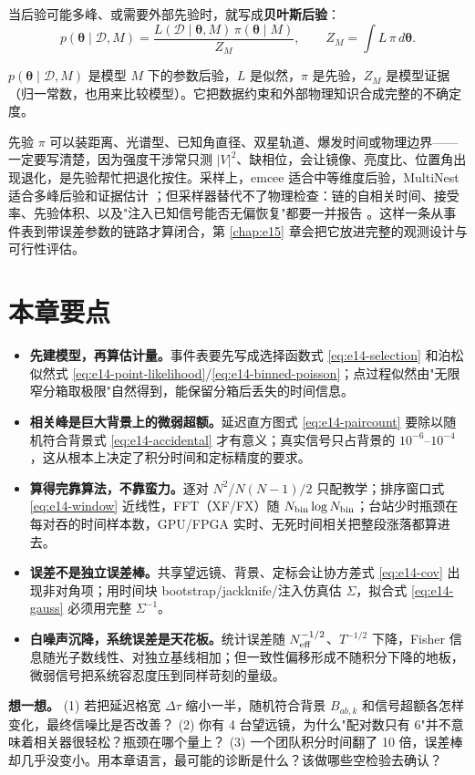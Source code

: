 当后验可能多峰、或需要外部先验时，就写成\textbf{贝叶斯后验}：
\begin{equation}
  p(\bm\theta\mid\mathcal D,M)=\frac{L(\mathcal D\mid\bm\theta,M)\,\pi(\bm\theta\mid M)}{Z_M},
  \qquad
  Z_M=\int L\,\pi\,d\bm\theta .
  \label{eq:e14-posterior}
\end{equation}
\begin{formulaexplain}
\(p(\bm\theta\mid\mathcal D,M)\) 是模型 \(M\) 下的参数后验，\(L\) 是似然，\(\pi\) 是先验，\(Z_M\) 是模型证据（归一常数，也用来比较模型）。它把数据约束和外部物理知识合成完整的不确定度。
\end{formulaexplain}
先验 \(\pi\) 可以装距离、光谱型、已知角直径、双星轨道、爆发时间或物理边界——一定要写清楚，因为强度干涉常只测 \(|V|^2\)、缺相位，会让镜像、亮度比、位置角出现退化，是先验帮忙把退化按住。采样上，emcee 适合中等维度后验，MultiNest 适合多峰后验和证据估计 \citep{2013PASP..125..306F,2009MNRAS.398.1601F}；但采样器替代不了物理检查：链的自相关时间、接受率、先验体积、以及"注入已知信号能否无偏恢复"都要一并报告 \citep{1992ApJ...398..146G}。这样一条从事件表到带误差参数的链路才算闭合，第 \ref{chap:e15} 章会把它放进完整的观测设计与可行性评估。

\section{本章要点}
\label{sec:e14-summary}

\begin{itemize}
  \item \textbf{先建模型，再算估计量。}事件表要先写成选择函数式 \eqref{eq:e14-selection} 和泊松似然式 \eqref{eq:e14-point-likelihood}/\eqref{eq:e14-binned-poisson}；点过程似然由"无限窄分箱取极限"自然得到，能保留分箱后丢失的时间信息。
  \item \textbf{相关峰是巨大背景上的微弱超额。}延迟直方图式 \eqref{eq:e14-paircount} 要除以随机符合背景式 \eqref{eq:e14-accidental} 才有意义；真实信号只占背景的 \(10^{-6}\)–\(10^{-4}\)，这从根本上决定了积分时间和定标精度的要求。
  \item \textbf{算得完靠算法，不靠蛮力。}逐对 \(N^2\)/\(N(N-1)/2\) 只配教学；排序窗口式 \eqref{eq:e14-window} 近线性，FFT（XF/FX）随 \(N_{\rm bin}\log N_{\rm bin}\)；台站少时瓶颈在每对吞的时间样本数，GPU/FPGA 实时、无死时间相关把整段涨落都算进去。
  \item \textbf{误差不是独立误差棒。}共享望远镜、背景、定标会让协方差式 \eqref{eq:e14-cov} 出现非对角项；用时间块 bootstrap/jackknife/注入仿真估 \(\Sigma\)，拟合式 \eqref{eq:e14-gauss} 必须用完整 \(\Sigma^{-1}\)。
  \item \textbf{白噪声沉降，系统误差是天花板。}统计误差随 \(N_{\rm eff}^{-1/2}\)、\(T^{-1/2}\) 下降，Fisher 信息随光子数线性、对独立基线相加；但一致性偏移形成不随积分下降的地板，微弱信号把系统容忍度压到同样苛刻的量级。
\end{itemize}

\medskip
\noindent\textbf{想一想。}
(1) 若把延迟格宽 \(\Delta\tau\) 缩小一半，随机符合背景 \(B_{ab,k}\) 和信号超额各怎样变化，最终信噪比是否改善？
(2) 你有 4 台望远镜，为什么"配对数只有 6"并不意味着相关器很轻松？瓶颈在哪个量上？
(3) 一个团队积分时间翻了 10 倍，误差棒却几乎没变小。用本章语言，最可能的诊断是什么？该做哪些空检验去确认？
